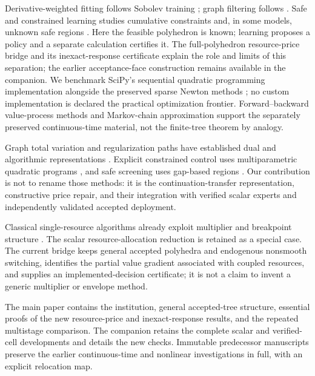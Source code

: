 \documentclass[11pt,letterpaper]{article}
\theoremstyle{definition}
\newcommand{\1}{\mathbf 1}
\begin{document}
Derivative-weighted fitting follows Sobolev training \citep{Czarnecki2017}; graph filtering follows \citet{Defferrard2016}. Safe and constrained learning studies cumulative constraints and, in some models, unknown safe regions \citep{Satija2020,WachiSui2020}. Here the feasible polyhedron is known; learning proposes a policy and a separate calculation certifies it. The full-polyhedron resource-price bridge and its inexact-response certificate explain the role and limits of this separation; the earlier acceptance-face construction remains available in the companion. We benchmark SciPy's sequential quadratic programming implementation alongside the preserved sparse Newton methods \citep{Virtanen2020}; no custom implementation is declared the practical optimization frontier. Forward--backward value-process methods \citep{MaProtterYong1994,HanJentzenE2018} and Markov-chain approximation \citep{KushnerDupuis2001} support the separately preserved continuous-time material, not the finite-tree theorem by analogy.

Graph total variation and regularization paths have established dual and algorithmic representations \citep{TibshiraniTaylor2011,ArnoldTibshirani2016}. Explicit constrained control uses multiparametric quadratic programs \citep{Bemporad2002}, and safe screening uses gap-based regions \citep{Fercoq2015}. Our contribution is not to rename those methods: it is the continuation-transfer representation, constructive price repair, and their integration with verified scalar experts and independently validated accepted deployment.

Classical single-resource algorithms already exploit multiplier and breakpoint structure \citep{PatrikssonStromberg2015}. The scalar resource-allocation reduction is retained as a special case. The current bridge keeps general accepted polyhedra and endogenous nonsmooth switching, identifies the partial value gradient associated with coupled resources, and supplies an implemented-decision certificate; it is not a claim to invent a generic multiplier or envelope method.

The main paper contains the institution, general accepted-tree structure, essential proofs of the new resource-price and inexact-response results, and the repeated multistage comparison. The companion retains the complete scalar and verified-cell developments and details the new checks. Immutable predecessor manuscripts preserve the earlier continuous-time and nonlinear investigations in full, with an explicit relocation map.
\end{document}
